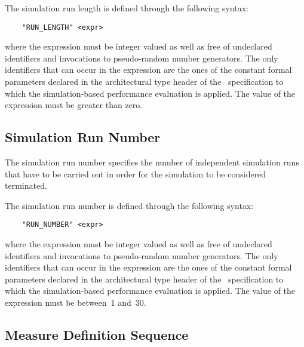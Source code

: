 The simulation run length is defined through the following syntax:

        \begin{verbatim}
    "RUN_LENGTH" <expr>
        \end{verbatim}

\noindent where the expression must be integer valued as well as free of undeclared identifiers and
invocations to pseudo-random number generators. The only identifiers that can occur in the expression are
the ones of the constant formal parameters declared in the architectural type header of the \aemilia\
specification to which the simulation-based performance evaluation is applied. The value of the expression
must be greater than zero.


\subsection{Simulation Run Number}

The simulation run number specifies the number of independent simulation runs that have to be carried out
in order for the simulation to be considered terminated.

The simulation run number is defined through the following syntax:

        \begin{verbatim}
    "RUN_NUMBER" <expr>
        \end{verbatim}

\noindent where the expression must be integer valued as well as free of undeclared identifiers and
invocations to pseudo-random number generators. The only identifiers that can occur in the expression are
the ones of the constant formal parameters declared in the architectural type header of the \aemilia\
specification to which the simulation-based performance evaluation is applied. The value of the expression
must be between~1 and~30.


\subsection{Measure Definition Sequence}

